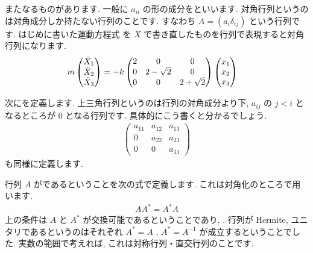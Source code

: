 \documentclass[openany, a4paper, oneside]{jsbook}
\theoremstyle{break}
\theoremstyle{breakdefn}
\begin{document}
またなるものがあります.
一般に $a_{ii}$ の形の成分をといいます.
対角行列というのは対角成分しか持たない行列のことです.
すなわち $A = (a_{i} \delta _{ij} )$ という行列です. はじめに書いた運動方程式
を $X$ で書き直したものを行列で表現すると対角行列になります.
    \begin{align}
        m \begin{pmatrix} \ddot{X}_{1} \\ \ddot{X}_{2} \\ \ddot{X}_{3} \end{pmatrix}
        &= -k \begin{pmatrix} 2 & 0 & 0 \\ 0 & 2- \sqrt{2} & 0 \\ 0 & 0 & 2 + \sqrt{2} \end{pmatrix}
        \begin{pmatrix} x_{1} \\ x_{2} \\ x_{3} \end{pmatrix} \notag
    \end{align}

次にを定義します.
上三角行列というのは行列の対角成分より下,  $a_{ij}$ の $j< i$ となるところが
 $0$ となる行列です. 具体的にこう書くと分かるでしょう.
    \begin{align}
        \begin{pmatrix} a_{11} & a_{12} & a_{13} \\
                        0 & a_{22} & a_{23} \\
                        0 & 0 & a_{33}
        \end{pmatrix}
    \end{align}
も同様に定義します.

行列 $A$ がであるということを次の式で定義します.
これは対角化のところで用います.
    \begin{align}
        AA^{*} = A^{*}A
    \end{align}
上の条件は $A$ と $A^{*}$ が交換可能であるということであり, . 行列が Hermite, ユニタリであるというのはそれぞれ $A^{*}=A$ ,  $A^{*} = A^{-1}$ が成立するということでした.
実数の範囲で考えれば, これは対称行列・直交行列のことです.
\end{document}
